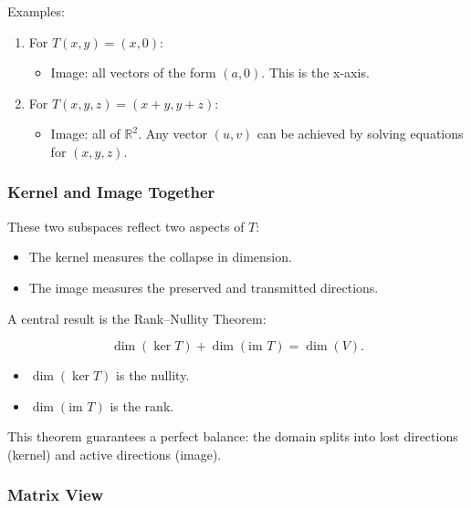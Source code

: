\documentclass[
  letterpaper,
  DIV=11,
  numbers=noendperiod]{scrreprt}
\providecommand{\tightlist}{%
  \setlength{\itemsep}{0pt}\setlength{\parskip}{0pt}}
\begin{document}
Examples:

\begin{enumerate}
\def\labelenumi{\arabic{enumi}.}
\item
  For \(T(x,y) = (x,0)\):

  \begin{itemize}
  \tightlist
  \item
    Image: all vectors of the form \((a,0)\). This is the x-axis.
  \end{itemize}
\item
  For \(T(x,y,z) = (x+y, y+z)\):

  \begin{itemize}
  \tightlist
  \item
    Image: all of \(\mathbb{R}^2\). Any vector \((u,v)\) can be achieved
    by solving equations for \((x,y,z)\).
  \end{itemize}
\end{enumerate}

\subsubsection{Kernel and Image
Together}\label{kernel-and-image-together}

These two subspaces reflect two aspects of \(T\):

\begin{itemize}
\tightlist
\item
  The kernel measures the collapse in dimension.
\item
  The image measures the preserved and transmitted directions.
\end{itemize}

A central result is the Rank--Nullity Theorem:

\[
\dim(\ker T) + \dim(\text{im }T) = \dim(V).
\]

\begin{itemize}
\tightlist
\item
  \(\dim(\ker T)\) is the nullity.
\item
  \(\dim(\text{im }T)\) is the rank.
\end{itemize}

This theorem guarantees a perfect balance: the domain splits into lost
directions (kernel) and active directions (image).

\subsubsection{Matrix View}\label{matrix-view}
\end{document}
